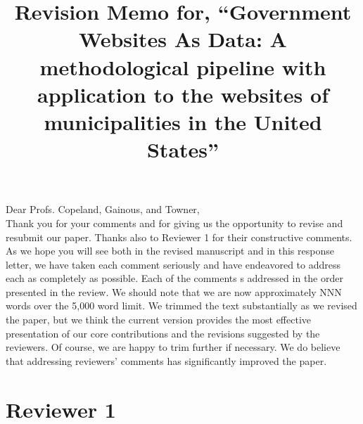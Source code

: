 \documentclass[12pt,titlepage]{article}
\title{Revision Memo for, ``Government Websites As Data: A methodological pipeline with application to the websites of municipalities in the United States''}
\begin{document}
\maketitle

Dear Profs. Copeland, Gainous, and Towner,\\

Thank you for your comments and for giving us the opportunity to revise and resubmit our paper. Thanks also to Reviewer 1 for their constructive comments. As we hope you will see both in the revised manuscript and in this response letter, we have taken each comment seriously and have endeavored to address each as completely as possible. Each of the comments s addressed in the order presented in the review.  We should note that we are now approximately NNN words over the 5,000 word limit. We trimmed the text substantially as we revised the paper, but we think the current version provides the most effective presentation of our core contributions and the revisions suggested by the reviewers. Of course, we are happy to trim further if necessary.  We do believe that addressing reviewers' comments has significantly improved the paper. \\

\section*{Reviewer 1}
\end{document}

